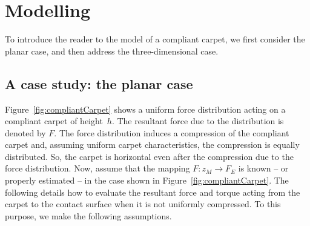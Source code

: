\documentclass{article}
\begin{document}
\begin{itemize}
\end{itemize}

\section{Modelling}
To introduce the reader to the model of a compliant carpet, we first consider the planar case, and then address the three-dimensional case.

\subsection{A case study: the planar case}

Figure~\ref{fig:compliantCarpet} shows a uniform force distribution acting on a compliant carpet of height~$h$. The resultant force due to the distribution is denoted by $F$. The force distribution induces a compression of the compliant carpet and, assuming uniform carpet characteristics, the  compression is equally distributed. So,  the carpet is horizontal even after the compression due to the force distribution. Now, assume that the mapping $F: z_M \rightarrow F_E$ is known -- or properly estimated --  in the case shown in Figure~\ref{fig:compliantCarpet}. The following details how to evaluate the resultant force and torque acting from the carpet to the contact surface  when it is not uniformly compressed. To this purpose, we make the following assumptions.

 \begin{figure}[t]
\end{figure}
\end{document}
